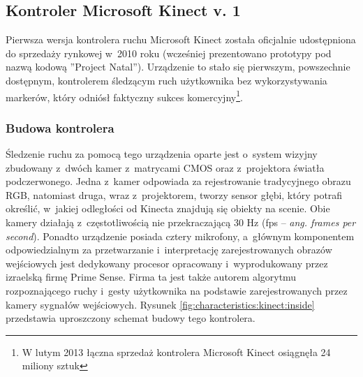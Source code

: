 \subsection{Kontroler Microsoft Kinect v. 1}\label{sec:characteristics:kinect}
Pierwsza wersja kontrolera ruchu Microsoft Kinect została oficjalnie udostępniona do sprzedaży rynkowej w~2010 roku (wcześniej prezentowano prototypy pod nazwą kodową ''Project Natal''). Urządzenie to stało się pierwszym, powszechnie dostępnym, kontrolerem śledzącym ruch użytkownika bez wykorzystywania markerów, który odniósł faktyczny sukces komercyjny\footnote{W lutym 2013 łączna sprzedaż kontrolera Microsoft Kinect osiągnęła 24 miliony sztuk }.  
																													
\subsubsection*{Budowa kontrolera}
Śledzenie ruchu za pomocą tego urządzenia oparte jest o~system wizyjny zbudowany z~dwóch kamer z~matrycami CMOS oraz z~projektora światła podczerwonego. Jedna z~kamer odpowiada za rejestrowanie tradycyjnego obrazu RGB, natomiast druga, wraz z~projektorem, tworzy sensor głębi, który potrafi określić, w~jakiej odległości od Kinecta znajdują się obiekty na scenie. Obie kamery działają z~częstotliwością nie przekraczającą 30 Hz (fps -- \emph{ang. frames per second}). Ponadto urządzenie posiada cztery mikrofony, a~głównym komponentem odpowiedzialnym za przetwarzanie i~interpretację zarejestrowanych obrazów wejściowych jest dedykowany procesor opracowany i~wyprodukowany przez izraelską firmę Prime Sense. Firma ta jest także autorem algorytmu rozpoznającego ruchy i~gesty użytkownika na podstawie zarejestrowanych przez kamery sygnałów wejściowych. Rysunek \ref{fig:characteristics:kinect:inside} przedstawia uproszczony schemat budowy tego kontrolera. 
																													

